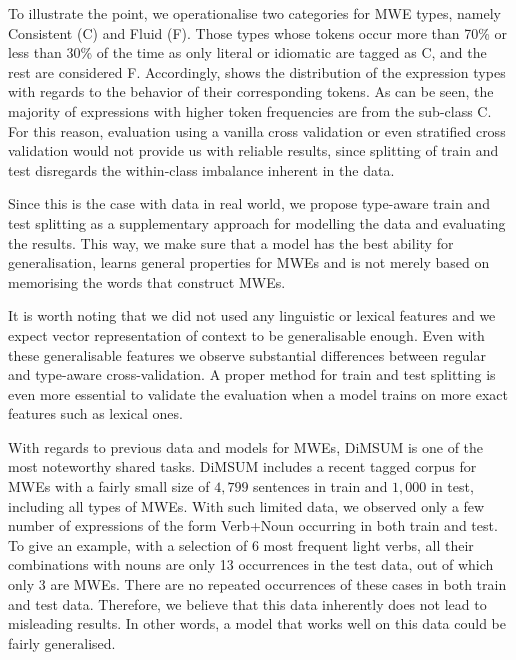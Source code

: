 \documentclass[output=paper
,modfonts
,nonflat]{langsci/langscibook}
\begin{document}
To illustrate the point, we operationalise two categories for MWE types, namely Consistent (C) and Fluid (F). Those types whose tokens occur more than 70\% or less than 30\% of the time as only literal or idiomatic are tagged as C, and the rest are considered F. Accordingly, %
 shows the distribution of the expression types with regards to the behavior of their corresponding tokens. As can be seen, the majority of expressions with higher token frequencies are from the sub-class C. 
For this reason, evaluation using a vanilla cross validation or even stratified cross validation would not provide us with reliable results, since splitting of train and test disregards the within-class imbalance inherent in the data. 

Since this is the case with data in real world, we propose type-aware train and test splitting as a supplementary approach for modelling the data and evaluating the results. This way, we make sure that a model has the best ability for generalisation, learns general properties for MWEs and is not merely based on memorising the words that construct MWEs.%

It is worth noting that we did not used any linguistic or lexical features and we expect vector representation of context to be generalisable enough. Even with these generalisable features we observe substantial differences between regular and type-aware cross-validation.
A proper method for train and test splitting is even more essential to validate the evaluation when a model trains on more exact features such as lexical ones.

With regards to previous data and models for MWEs, DiMSUM is one of the most noteworthy shared tasks.
DiMSUM includes a recent tagged corpus for MWEs with a fairly small size of $4,799$ sentences in train and $1,000$ in test, including all types of MWEs. With such limited data, we observed only a few number of expressions of the form Verb+Noun occurring in both train and test. To give an example, with a selection of 6 most frequent light verbs, all their combinations with nouns are only 13 occurrences in the test data, out of which only 3 are MWEs. There are no repeated occurrences of these cases in both train and test data. Therefore, we believe that this data inherently does not lead to misleading results. In other words, a model that works well on this data could be fairly generalised.
\end{document}
